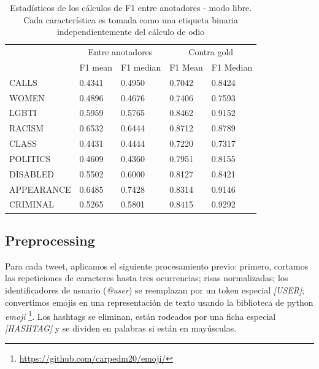 \begin{table}
    \centering
    \begin{tabular}{lll|ll}
        \hline
                   & \multicolumn{2}{c}{Entre anotadores} & \multicolumn{2}{c}{Contra gold} \\
        {}         &  F1 mean&  F1 median  & F1 Mean  &  F1 Median \\
        \hline
        CALLS      &  0.4341 &   0.4950   &  0.7042   &   0.8424  \\
        WOMEN      &  0.4896 &   0.4676   &  0.7406   &   0.7593  \\
        LGBTI      &  0.5959 &   0.5765   &  0.8462   &   0.9152  \\
        RACISM     &  0.6532 &   0.6444   &  0.8712   &   0.8789  \\
        CLASS      &  0.4431 &   0.4444   &  0.7220   &   0.7317  \\
        POLITICS   &  0.4609 &   0.4360   &  0.7951   &   0.8155  \\
        DISABLED   &  0.5502 &   0.6000   &  0.8127   &   0.8421  \\
        APPEARANCE &  0.6485 &   0.7428   &  0.8314   &   0.9146  \\
        CRIMINAL   &  0.5265 &   0.5801   &  0.8415   &   0.9292  \\
        \bottomrule
    \end{tabular}

    \caption{Estadísticos de los cálculos de F1 entre anotadores - modo libre. Cada característica es tomada como una etiqueta binaria independientemente del cálculo de odio}
    \label{tab:ia_f1_scores_free_mode}
\end{table}


\subsection{Preprocessing}

Para cada tweet, aplicamos el siguiente procesamiento previo: primero, cortamos las repeticiones de caracteres hasta tres ocurrencias; risas normalizadas; los identificadores de usuario (\emph{@user}) se reemplazan por un token especial \emph{[USER]}; convertimos emojis en una representación de texto usando la biblioteca de python \emph{emoji} \footnote {\url{https://github.com/carpedm20/emoji/}}. Los hashtags se eliminan, están rodeados por una ficha especial \emph{[HASHTAG]} y se dividen en palabras si están en mayúsculas.

